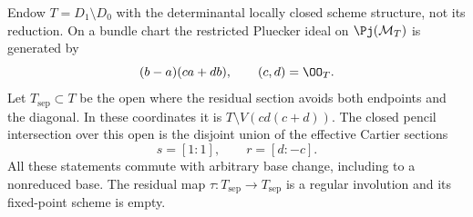 \begin{lemma}
\label{lem:residual-cartier-sections}
Endow \(T=D_1\setminus D_0\) with the determinantal locally
closed scheme structure, not its reduction.  On a bundle chart the
restricted Pluecker ideal on \(\Pj(\mathcal M_T)\) is generated
by
\[
            (b-a)(ca+db),\qquad (c,d)=\OO_T.
\]
Let \(T_{\mathrm{sep}}\subset T\) be the open where the residual
section avoids both endpoints and the diagonal.  In these coordinates
it is \(T\setminus V(cd(c+d))\).  The closed pencil intersection
over this open is the disjoint union of the effective Cartier sections
\[
                    s=[1:1],\qquad r=[d:-c].
\]
All these statements commute with arbitrary base change, including
to a nonreduced base.  The residual map
\(\tau:T_{\mathrm{sep}}\to T_{\mathrm{sep}}\) is a regular
involution and its fixed-point scheme is empty.
\end{lemma}
